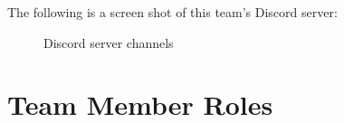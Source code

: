 \documentclass[12pt]{article}
\begin{document}
The following is a screen shot of this team's Discord server:\\

\begin{figure}[!htb]
        \caption{\label{fig:my-label} Discord server channels}
\end{figure}


\section{Team Member Roles}
\end{document}

